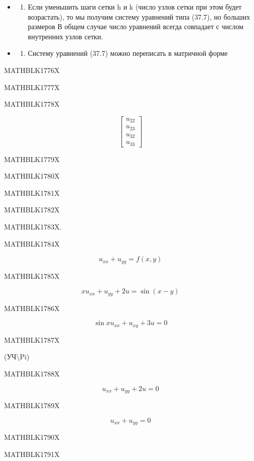 \documentclass[
]{article}
\providecommand{\tightlist}{%
  \setlength{\itemsep}{0pt}\setlength{\parskip}{0pt}}
\begin{document}
\begin{itemize}
\tightlist
\item
  \begin{enumerate}
  \def\labelenumi{\arabic{enumi}.}
  \setcounter{enumi}{1}
  \tightlist
  \item
    Если уменьшить шаги сетки h и k (число узлов сетки при этом будет
    возрастать), то мы получим систему уравнений типа (37.7), но больших
    размеров В общем случае число уравнений всегда совпадает с числом
    внутренних узлов сетки.
  \end{enumerate}
\item
  \begin{enumerate}
  \def\labelenumi{\arabic{enumi}.}
  \setcounter{enumi}{2}
  \tightlist
  \item
    Систему уравнений (37.7) можно переписать в матричной форме
  \end{enumerate}
\end{itemize}

MATHBLK1776X

MATHBLK1777X

MATHBLK1778X

\[
\begin{bmatrix} u_{22} \\ u_{23} \\ u_{32} \\ u_{33} \end{bmatrix}
\]

MATHBLK1779X

MATHBLK1780X

MATHBLK1781X

MATHBLK1782X

MATHBLK1783X.

MATHBLK1784X

\[
u_{xx} + u_{yy} = f(x, y)
\]

MATHBLK1785X

\[
xu_{xx} + u_{yy} + 2u = \sin(x - y)
\]

MATHBLK1786X

\[
\sin xu_{xx} + u_{xy} + 3u = 0
\]

MATHBLK1787X

(УЧ\textbackslash Pi)

MATHBLK1788X

\[
u_{xx} + u_{yy} + 2u = 0
\]

MATHBLK1789X

\[
u_{xx} + u_{yy} = 0
\]

MATHBLK1790X

MATHBLK1791X
\end{document}
